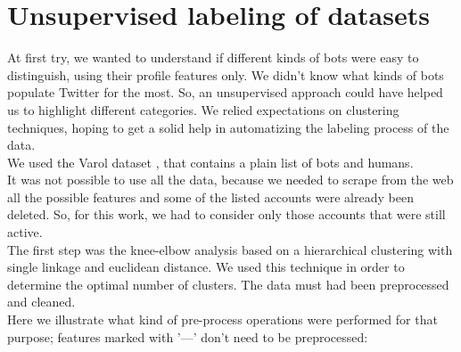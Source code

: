 \section{Unsupervised labeling of datasets}
At first try, we wanted to understand if different kinds of bots were easy to distinguish, using their profile features only. We didn't know what kinds of bots populate Twitter for the most. So, an unsupervised approach could have helped us to highlight different categories. We relied expectations on clustering techniques, hoping to get a solid help in automatizing the labeling process of the data.\\
We used the Varol dataset \cite{Varol}, that contains a plain list of bots and humans.\\
It was not possible to use all the data, because we needed to scrape from the web all the possible features and some of the listed accounts were already been deleted. So, for this work, we had to consider only those accounts that were still active.\\
The first step was the knee-elbow analysis based on a hierarchical clustering with single linkage and euclidean distance. We used this technique in order to determine the optimal number of clusters. The data must had been preprocessed and cleaned.\\
Here we illustrate what kind of pre-process operations were performed for that purpose; features marked with '---' don't need to be preprocessed:

